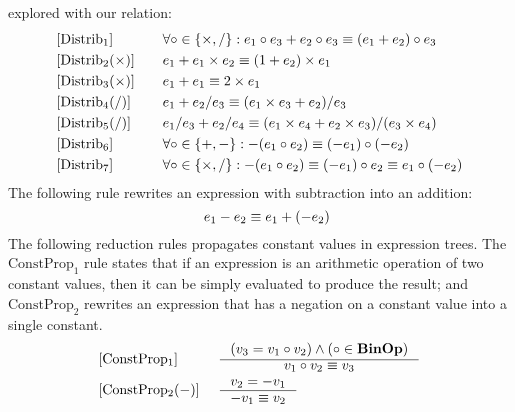 explored with our relation:
\begin{equation}
    \begin{aligned}{}
        & [\mathrm{Distrib}_1] & \quad &
            \forall \circ \in \{ \times, / \}:
            e_1 \circ e_3 + e_2 \circ e_3 \equiv (e_1 + e_2) \circ e_3 \\
        & [\mathrm{Distrib}_2 (\times)] & \quad &
            e_1 + e_1 \times e_2 \equiv (1 + e_2) \times e_1 \\
        & [\mathrm{Distrib}_3 (\times)] & \quad &
            e_1 + e_1 \equiv 2 \times e_1 \\
        & [\mathrm{Distrib}_4 (/)] & \quad &
            e_1 + e_2 / e_3 \equiv (e_1 \times e_3 + e_2) / e_3 \\
        & [\mathrm{Distrib}_5 (/)] & \quad &
            e_1 / e_3 + e_2 / e_4 \equiv
            (e_1 \times e_4 + e_2 \times e_3) / (e_3 \times e_4) \\
        & [\mathrm{Distrib}_6] & \quad &
            \forall \circ \in \{ +, - \}:
            -(e_1 \circ e_2) \equiv (-e_1) \circ (-e_2) \\
        & [\mathrm{Distrib}_7] & \quad &
            \forall \circ \in \{ \times, / \}:
            -(e_1 \circ e_2) \equiv (-e_1) \circ e_2 \equiv e_1 \circ (-e_2)
    \end{aligned}
\end{equation}
The following rule rewrites an expression with subtraction into an addition:
\begin{equation}
    [\mathrm{Subtract}] \quad
    e_1 - e_2 \eqrel e_1 + (-e_2)
\end{equation}
The following reduction rules propagates constant values in expression
trees. The $\mathrm{ConstProp}_1$ rule states that if an expression is an
arithmetic operation of two constant values, then it can be simply evaluated to
produce the result; and $\mathrm{ConstProp}_2$ rewrites an expression that has
a negation on a constant value into a single constant.
\begin{equation}
    \begin{aligned}{}
        & [\mathrm{ConstProp_1}] &~&
        \inference{%
            (v_3 = v_1 \circ v_2) \wedge
            (\circ \in \binopset)
        }{%
            v_1 \circ v_2 \eqrel v_3
        } \\
        & [\mathrm{ConstProp_2} (-)] &~&
        \inference{%
            v_2 = -v_1
        }{%
            -v_1 \eqrel v_2
        }
    \end{aligned}
    \label{so:eq:constant_propagation}
\end{equation}

